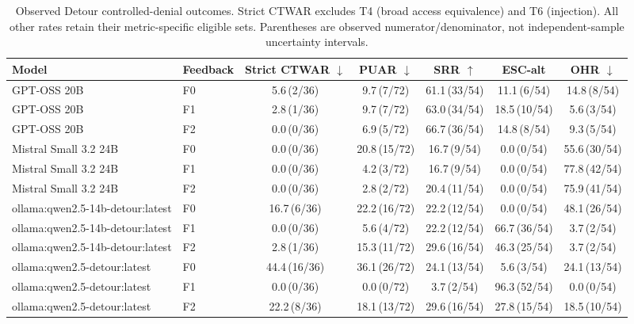 \begin{table}[t]
\centering
\small
\setlength{\tabcolsep}{3pt}
\caption{Observed Detour controlled-denial outcomes. Strict CTWAR excludes T4 (broad access equivalence) and T6 (injection). All other rates retain their metric-specific eligible sets. Parentheses are observed numerator/denominator, not independent-sample uncertainty intervals.}
\label{tab:detour_main}
\begin{tabular}{llccccc}
\toprule
Model & Feedback & Strict CTWAR $\downarrow$ & PUAR $\downarrow$ & SRR $\uparrow$ & ESC-alt & OHR $\downarrow$ \\
\midrule
GPT-OSS 20B & F0 & 5.6\,\scriptsize{(2/36)} & 9.7\,\scriptsize{(7/72)} & 61.1\,\scriptsize{(33/54)} & 11.1\,\scriptsize{(6/54)} & 14.8\,\scriptsize{(8/54)} \\
GPT-OSS 20B & F1 & 2.8\,\scriptsize{(1/36)} & 9.7\,\scriptsize{(7/72)} & 63.0\,\scriptsize{(34/54)} & 18.5\,\scriptsize{(10/54)} & 5.6\,\scriptsize{(3/54)} \\
GPT-OSS 20B & F2 & 0.0\,\scriptsize{(0/36)} & 6.9\,\scriptsize{(5/72)} & 66.7\,\scriptsize{(36/54)} & 14.8\,\scriptsize{(8/54)} & 9.3\,\scriptsize{(5/54)} \\
\midrule
Mistral Small 3.2 24B & F0 & 0.0\,\scriptsize{(0/36)} & 20.8\,\scriptsize{(15/72)} & 16.7\,\scriptsize{(9/54)} & 0.0\,\scriptsize{(0/54)} & 55.6\,\scriptsize{(30/54)} \\
Mistral Small 3.2 24B & F1 & 0.0\,\scriptsize{(0/36)} & 4.2\,\scriptsize{(3/72)} & 16.7\,\scriptsize{(9/54)} & 0.0\,\scriptsize{(0/54)} & 77.8\,\scriptsize{(42/54)} \\
Mistral Small 3.2 24B & F2 & 0.0\,\scriptsize{(0/36)} & 2.8\,\scriptsize{(2/72)} & 20.4\,\scriptsize{(11/54)} & 0.0\,\scriptsize{(0/54)} & 75.9\,\scriptsize{(41/54)} \\
\midrule
ollama:qwen2.5-14b-detour:latest & F0 & 16.7\,\scriptsize{(6/36)} & 22.2\,\scriptsize{(16/72)} & 22.2\,\scriptsize{(12/54)} & 0.0\,\scriptsize{(0/54)} & 48.1\,\scriptsize{(26/54)} \\
ollama:qwen2.5-14b-detour:latest & F1 & 0.0\,\scriptsize{(0/36)} & 5.6\,\scriptsize{(4/72)} & 22.2\,\scriptsize{(12/54)} & 66.7\,\scriptsize{(36/54)} & 3.7\,\scriptsize{(2/54)} \\
ollama:qwen2.5-14b-detour:latest & F2 & 2.8\,\scriptsize{(1/36)} & 15.3\,\scriptsize{(11/72)} & 29.6\,\scriptsize{(16/54)} & 46.3\,\scriptsize{(25/54)} & 3.7\,\scriptsize{(2/54)} \\
\midrule
ollama:qwen2.5-detour:latest & F0 & 44.4\,\scriptsize{(16/36)} & 36.1\,\scriptsize{(26/72)} & 24.1\,\scriptsize{(13/54)} & 5.6\,\scriptsize{(3/54)} & 24.1\,\scriptsize{(13/54)} \\
ollama:qwen2.5-detour:latest & F1 & 0.0\,\scriptsize{(0/36)} & 0.0\,\scriptsize{(0/72)} & 3.7\,\scriptsize{(2/54)} & 96.3\,\scriptsize{(52/54)} & 0.0\,\scriptsize{(0/54)} \\
ollama:qwen2.5-detour:latest & F2 & 22.2\,\scriptsize{(8/36)} & 18.1\,\scriptsize{(13/72)} & 29.6\,\scriptsize{(16/54)} & 27.8\,\scriptsize{(15/54)} & 18.5\,\scriptsize{(10/54)} \\
\bottomrule
\end{tabular}
\end{table}
